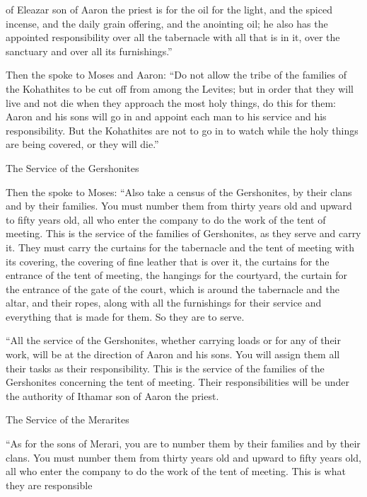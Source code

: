 {of Eleazar
son
of Aaron
the priest
is for the oil
for the light,
and the spiced
incense,
and the daily
grain offering,
and the anointing
oil;
he also has the appointed responsibility
over all
the tabernacle
with all
that
is in it, over the sanctuary
and over all its furnishings.”
\par }{\PP {}Then the
{}
spoke
to
Moses
and Aaron:
“Do not
allow the tribe
of the families
of the Kohathites
to be cut off from among
the Levites;
but in order that they will live
and not
die
when they approach
the
most
holy things,
do
this for them: Aaron
and his sons
will go
in and appoint
each
man
to his service
and his responsibility.
But
the Kohathites are not
to go
in to watch
while
the holy
things are being covered, or they will die.”
\par }{\SH The Service of the Gershonites
\par }{\PP {}Then the
{}
spoke
to
Moses:
“Also
take
a census
of the Gershonites,
by their clans and by their
families.
You must
number them
from thirty
years
old and upward
to
fifty
years
old, all
who enter
the company
to do the work
of the tent
of meeting.
This
is the service
of the families
of Gershonites,
as they serve
and carry it.
They must carry
the
curtains
for the tabernacle
and the
tent
of meeting
with its covering,
the covering
of fine leather
that
is over
it, the curtains
for the entrance
of the tent
of meeting,
the
hangings
for the courtyard,
the curtain
for the entrance
of the gate
of the court,
which
is around
the
tabernacle
and the altar,
and their ropes,
along
with all
the furnishings
for their service
and everything
that
is made
for them. So they are to serve.
\par }{\PP {}“All
the service
of the Gershonites,
whether carrying loads
or for any
of their work,
will be at the direction of Aaron
and his sons.
You will assign them
all
their tasks
as their responsibility.
This
is the service
of the families
of the Gershonites
concerning the tent
of meeting.
Their responsibilities
will be under the authority
of Ithamar
son
of Aaron
the priest.
\par }{\SH The Service of the Merarites
\par }{\PP {}“As for the sons
of Merari,
you are to number
them by their families
and by their clans.
You must number them from thirty
years
old and upward
to
fifty
years
old, all
who enter
the
company
to do the work
of the tent
of meeting.
This
is what they are responsible
}
